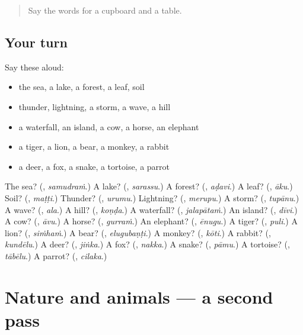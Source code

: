 \label{lesson:TE-R129-first-pass-food-and-nature}



\begin{quote}
Say the words for a cupboard and a table.
\end{quote}

\subsection*{Your turn}
Say these aloud:

\begin{itemize}
\raggedright
  \item the sea, a lake, a forest, a leaf, soil
  \item thunder, lightning, a storm, a wave, a hill
  \item a waterfall, an island, a cow, a horse, an elephant
  \item a tiger, a lion, a bear, a monkey, a rabbit
  \item a deer, a fox, a snake, a tortoise, a parrot
\end{itemize}

\begin{tcolorbox}[breakable,colback=teal!4,colframe=teal!35!black,title={Before you move on}]
The sea? (\textbf{}, \emph{samudraṁ}.) A lake? (\textbf{}, \emph{sarassu}.) A forest? (\textbf{}, \emph{aḍavi}.) A leaf? (\textbf{}, \emph{āku}.) Soil? (\textbf{}, \emph{maṭṭi}.) Thunder? (\textbf{}, \emph{urumu}.) Lightning? (\textbf{}, \emph{merupu}.) A storm? (\textbf{}, \emph{tupānu}.) A wave? (\textbf{}, \emph{ala}.) A hill? (\textbf{}, \emph{koṇḍa}.) A waterfall? (\textbf{}, \emph{jalapātaṁ}.) An island? (\textbf{}, \emph{dīvi}.) A cow? (\textbf{}, \emph{āvu}.) A horse? (\textbf{}, \emph{gurraṁ}.) An elephant? (\textbf{}, \emph{ēnugu}.) A tiger? (\textbf{}, \emph{puli}.) A lion? (\textbf{}, \emph{siṁhaṁ}.) A bear? (\textbf{}, \emph{elugubaṇṭi}.) A monkey? (\textbf{}, \emph{kōti}.) A rabbit? (\textbf{}, \emph{kundēlu}.) A deer? (\textbf{}, \emph{jiṅka}.) A fox? (\textbf{}, \emph{nakka}.) A snake? (\textbf{}, \emph{pāmu}.) A tortoise? (\textbf{}, \emph{tābēlu}.) A parrot? (\textbf{}, \emph{cilaka}.)
\end{tcolorbox}
\section[(dialogue)]{Nature and animals — a second pass}


